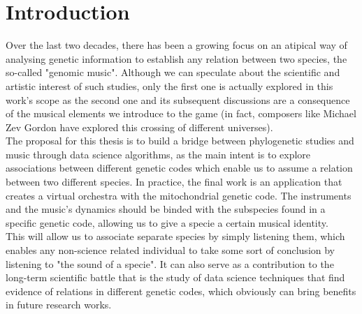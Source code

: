 \documentclass[11pt,twoside,a4paper]{report}
\begin{document}
\chapter{Introduction}
Over the last two decades, there has been a growing focus on an atipical way of analysing genetic information to establish any relation between two species, the so-called "genomic music". Although we can speculate about the scientific and artistic interest of such studies, only the first one is actually explored in this work's scope as the second one and its subsequent discussions are a consequence of the musical elements we introduce to the game (in fact, composers like Michael Zev Gordon \cite{guardian} have explored this crossing of different universes). 
\\The proposal for this thesis is to build a bridge between phylogenetic studies and music through data science algorithms, as the main intent is to explore associations between different genetic codes which enable us to assume a relation between two different species. In practice, the final work is an application that creates a virtual orchestra with the mitochondrial genetic code. The instruments and the music's dynamics should be binded with the subspecies found in a specific genetic code, allowing us to give a specie a certain musical identity.
\\This will allow us to associate separate species by simply listening them, which enables any non-science related individual to take some sort of conclusion by listening to "the sound of a specie". It can also serve as a contribution to the long-term scientific battle that is the study of data science techniques that find evidence of relations in different genetic codes, which obviously can bring benefits in future research works.
\end{document}
